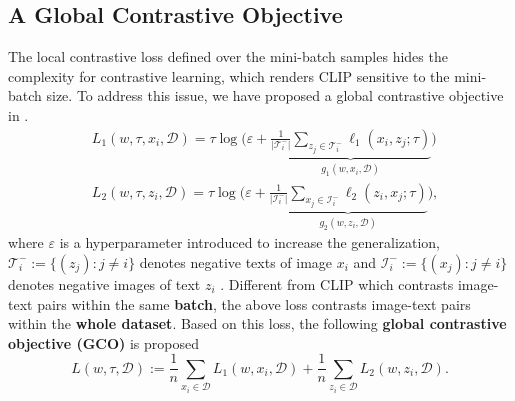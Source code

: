 \documentclass{article}
\begin{document}
\subsection{A Global Contrastive Objective}

The local contrastive loss defined over the mini-batch samples hides the complexity for contrastive learning, which renders CLIP sensitive to the mini-batch size. To address this issue, we have proposed a global contrastive objective in \cite{yuan2022provable}.
\begin{align*}
  &L_1(w, \tau, x_i, \mathcal{D})= \tau\log\bigg(\varepsilon + \underbrace{\frac{1}{|\mathcal T_i^-|} \sum_{z_j\in \mathcal{T}_i^-} \ell_1(x_i, z_j; \tau)}_{g_1(w, x_i, \mathcal{D})}\bigg)\\
  &L_2(w, \tau, z_i, \mathcal{D})= \tau\log \bigg(\varepsilon + \underbrace{\frac{1}{|\mathcal I_i^-|}\sum_{x_j\in \mathcal{I}_i^-} \ell_2(z_i, x_j; \tau)}_{g_2(w, z_i, \mathcal{D})}\bigg),
\end{align*}
where $\varepsilon$ is a hyperparameter introduced to increase the generalization,  \(\mathcal{T}_i^-:= \{( z_j): j\neq i\}\) denotes negative texts of image $x_i$ and \(\mathcal{I}_i^-:= \{(x_j): j\neq i\}\) denotes negative images of text $z_i$ . Different from CLIP which contrasts image-text pairs within the same \textbf{batch}, the above loss contrasts image-text pairs within the \textbf{whole dataset}. Based on this loss, the following \textbf{global contrastive objective (GCO)} is proposed
\begin{equation}\label{eq:gcl}
  L(w,\tau,  \mathcal{D}):= \frac{1}{n} \sum_{x_i\in \mathcal{D}} L_1(w, x_i, \mathcal{D})+ \frac{1}{n} \sum_{z_i\in \mathcal{D}} L_2(w, z_i, \mathcal{D}).
\end{equation}

\end{document}
